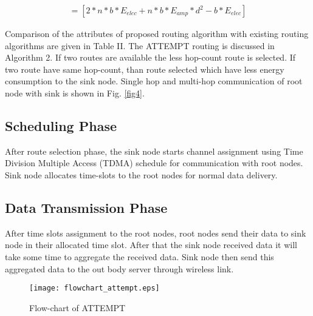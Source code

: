 \documentclass[journal]{IEEEtran}
\begin{document}
\begin{eqnarray}
= [2*n*b*E_{elec}+ n*b*E_{amp}*d ^{2}-b*E_{elec}]
\end{eqnarray}


Comparison of the attributes of proposed routing algorithm with existing routing algorithms are given in Table II. The ATTEMPT routing is discussed in Algorithm 2. If two routes are available the less hop-count route is selected. If two route have same hop-count, than route selected which have less energy consumption to the sink node. Single hop and multi-hop communication of root node with sink is shown in Fig. \ref{fig4}.

\begin{figure*}[ht]
  \centering
  \caption{Energy management for single-hop and multi-hop communication}\label{fig4}
\end{figure*}
\subsection{Scheduling Phase}
After route selection phase, the sink node starts channel assignment using Time Division Multiple Access (TDMA) schedule for communication with root nodes. Sink node allocates time-slots to the root nodes for normal data delivery.

\subsection{Data Transmission Phase}
After time slots assignment to the root nodes, root nodes send their data to sink node in their allocated time slot. After that the sink node received data it will take some time to aggregate the received data. Sink node then send this aggregated data to the out body server through wireless link.	

\begin{figure}[ht]
\begin{center}
\texttt{[image: flowchart\_attempt.eps]}
\caption{Flow-chart of ATTEMPT}\label{fig5}
\end{center}
\end{figure}
\end{document}
